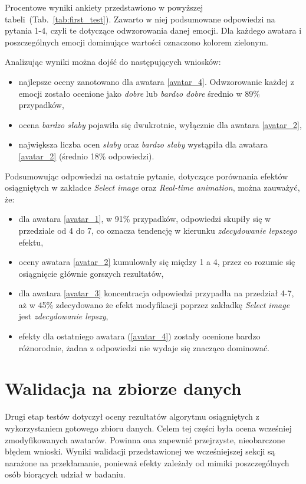 Procentowe wyniki ankiety przedstawiono w powyższej tabeli~(Tab.~\ref{tab:first_test}). Zawarto w niej podsumowane odpowiedzi na pytania 1-4, czyli te dotyczące odwzorowania danej emocji. Dla każdego awatara i poszczególnych emocji dominujące wartości oznaczono kolorem zielonym. 

Analizując wyniki można dojść do następujących wniosków:
\begin{itemize}
    \item najlepsze oceny zanotowano dla awatara \ref{avatar_4}. Odwzorowanie każdej z emocji zostało ocenione jako \textit{dobre} lub \textit{bardzo dobre} średnio w 89\% przypadków,
    \item ocena \textit{bardzo słaby} pojawiła się dwukrotnie, wyłącznie dla awatara \ref{avatar_2},
    \item największa liczba ocen \textit{słaby} oraz \textit{bardzo słaby} wystąpiła dla awatara \ref{avatar_2} (średnio 18\% odpowiedzi).
\end{itemize}


Podsumowując odpowiedzi na ostatnie pytanie, dotyczące porównania efektów osiągniętych w zakładce \textit{Select image} oraz \textit{Real-time animation}, można zauważyć, że:
\begin{itemize}
    \item dla awatara \ref{avatar_1}, w 91\% przypadków, odpowiedzi skupiły się w przedziale od 4 do 7, co oznacza tendencję w kierunku \textit{zdecydowanie lepszego} efektu,
    \item oceny awatara \ref{avatar_2} kumulowały się między 1 a 4, przez co rozumie się osiągnięcie głównie gorszych rezultatów,
    \item dla awatara \ref{avatar_3} koncentracja odpowiedzi przypadła na przedział 4-7, aż w 45\% zdecydowano że efekt modyfikacji poprzez zakładkę \textit{Select image} jest \textit{zdecydowanie lepszy},
    \item efekty dla ostatniego awatara (\ref{avatar_4}) zostały ocenione bardzo różnorodnie, żadna z odpowiedzi nie wydaje się znacząco dominować.
\end{itemize}



\section{Walidacja na zbiorze danych}
Drugi etap testów dotyczył oceny rezultatów algorytmu osiągniętych z wykorzystaniem gotowego zbioru danych. Celem tej części była ocena wcześniej zmodyfikowanych awatarów. Powinna ona zapewnić przejrzyste, nieobarczone błędem wnioski. Wyniki walidacji przedstawionej we wcześniejszej sekcji są narażone na przekłamanie, ponieważ efekty zależały od mimiki poszczególnych osób biorących udział w badaniu.

